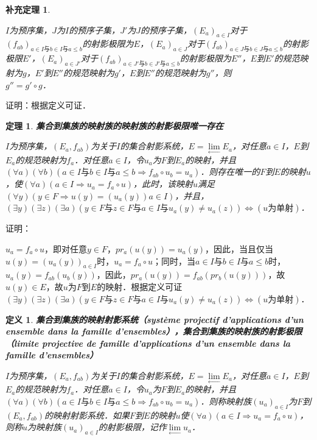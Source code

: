 \documentclass[12pt, a4paper, oneside]{book}
\newtheorem{theo}{定理}
\newtheorem{cor}{补充定理}
\newtheorem{de}{定义}
\begin{document}
			\begin{cor}\label{cor416}
				\hfill\par
				$I$为预序集，$J$为$I$的预序子集，$J'$为$J$的预序子集，$(E_a)_{a\in I}$对于$(f_{ab})_{a\in I\text{与}b\in I\text{与}a\leq b}$的射影极限为$E$，$(E_a)_{a\in J}$对于$(f_{ab})_{a\in J\text{与}b\in J\text{与}a\leq b}$的射影极限$E'$，$(E_a)_{a\in J'}$对于$(f_{ab})_{a\in J'\text{与}b\in J'\text{与}a\leq b}$的射影极限为$E''$，$E$到$E'$的规范映射为$g$，$E'$到$E''$的规范映射为$g'$，$E$到$E''$的规范映射为$g''$，则\\$g''=g'\circ g$．
			\end{cor}
			证明：根据定义可证．
					
			\begin{theo}\label{theo172}
				\textbf{集合到集族的映射族的映射族的射影极限唯一存在}
				\par
				$I$为预序集，$(E_a, f_{ab})$为关于$I$的集合射影系统，$E= \lim\limits_\gets E_a$，对任意$a\in I$，$E$到$E_a$的规范映射为$f_a$．对任意$a\in I$，令$u_a$为$F$到$E_a$的映射，并且$(\forall a)(\forall b)(a\in I\text{与}b\in I\text{与}a\leq b\Rightarrow f_{ab}\circ u_b=u_a)$．则存在唯一的$F$到$E$的映射$u$，使$(\forall a)(a\in I\Rightarrow u_a=f_a\circ u)$，此时，该映射$u$满足$(\forall y)(y\in F\Rightarrow u(y)=(u_a(y))a\in I)$，并且，$(\exists y)(\exists z)(\exists a)(y\in F\text{与}z\in F\text{与}a\in I\text{与}u_a(y)\neq u_a(z))\Leftrightarrow (u\text{为单射})$．
			\end{theo}
			证明：
			\par
			$u_a=f_a\circ u$，即对任意$y\in F$，$pr_a(u(y))=u_a(y)$，因此，当且仅当$u(y)=(u_a(y))_{a\in I}$时，$u_a=f_a\circ u$；同时，当$a\in I\text{与}b\in I\text{与}a\leq b$时，$u_a(y)=f_{ab}(u_b(y))$，因此，$pr_a(u(y))=f_{ab}(pr_b(u(y)))$，故$u(y)\in E$，故$u$为$F$到$E$的映射．根据定义可证$(\exists y)(\exists z)(\exists a)(y\in F\text{与}z\in F\text{与}a\in I\text{与}u_a(y)\neq u_a(z))\Leftrightarrow (u\text{为单射})$．
			
			\begin{de}
				\textbf{集合到集族的映射射影系统（système projectif d'applications d'un ensemble dans la famille d'ensembles），集合到集族的映射族的射影极限（limite projective de famille d'applications d'un ensemble dans la famille d'ensembles）
				}
				\par
				$I$为预序集，$(E_a, f_{ab})$为关于$I$的集合射影系统，$E= \lim\limits_\gets E_a$，对任意$a\in I$，$E$到$E_a$的规范映射为$f_a$．对任意$a\in I$，令$u_a$为$F$到$E_a$的映射，并且$(\forall a)(\forall b)(a\in I\text{与}b\in I\text{与}a\leq b\Rightarrow f_{ab}\circ u_b=u_a)$．则称映射族$(u_a)_{a\in I}$为$F$到$(E_a, f_{ab})$的映射射影系统．如果$F$到$E$的映射$u$使$(\forall a)(a\in I\Rightarrow u_a=f_a\circ u)$，则称$u$为映射族$(u_a)_{a\in I}$的射影极限，记作$\lim\limits_\gets u_a$．
			\end{de}
			
\end{document}
